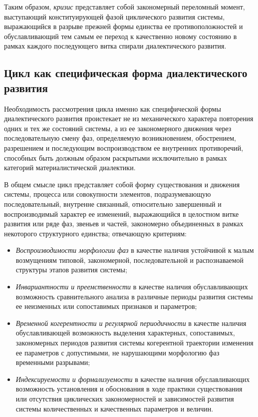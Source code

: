 Таким образом, \textit{кризис} представляет собой закономерный переломный момент, выступающий конституирующей фазой циклического развития системы, выражающийся в разрыве прежней формы единства ее противоположностей и обуславливающий тем самым ее переход к качественно новому состоянию в рамках каждого последующего витка спирали диалектического развития.

\subsection{Цикл как специфическая форма диалектического развития}
Необходимость рассмотрения цикла именно как специфической формы диалектического развития проистекает не из механического характера повторения одних и тех же состояний системы, а из ее закономерного движения через последовательную смену фаз, определяемую возникновением, обострением, разрешением и последующим воспроизводством ее внутренних противоречий, способных быть должным образом раскрытыми исключительно в рамках категорий материалистической диалектики.

В общем смысле цикл представляет собой форму существования и движения системы, процесса или совокупности элементов, подразумевающую последовательный, внутренне связанный, относительно завершенный и воспроизводимый характер ее изменений, выражающийся в целостном витке развития или ряде фаз, звеньев и частей, закономерно объединенных в рамках некоторого структурного единства; отвечающую критериям:
\begin{itemize}
    \item \textit{Воспроизводимости морфологии фаз} в качестве наличия устойчивой к малым возмущениям типовой, закономерной, последовательной и распознаваемой структуры этапов развития системы;
    \item \textit{Инвариантности и преемственности} в качестве наличия обуславливающих возможность сравнительного анализа в различные периоды развития системы ее неизменных или сопоставимых признаков и параметров;
    \item \textit{Временной когерентности и регулярной периодичности} в качестве наличия обуславливающей возможность выделения характерных, сопоставимых, закономерных периодов развития системы когерентной траектории изменения ее параметров с допустимыми, не нарушающими морфологию фаз временными разрывами;
    \item \textit{Индексируемости и формализуемости} в качестве наличия обуславливающих возможность установления и обоснования в ходе практики существования или отсутствия циклических закономерностей и зависимостей развития системы количественных и качественных параметров и величин.
\end{itemize}

